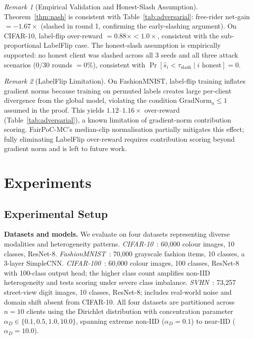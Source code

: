 \documentclass[journal]{IEEEtran}
\theoremstyle{definition}
\theoremstyle{remark}
\newtheorem{remark}{Remark}
\begin{document}
\begin{remark}[Empirical Validation and Honest-Slash Assumption]
\label{rem:empirical_val}
Theorem~\ref{thm:nash} is consistent with Table~\ref{tab:adversarial}:
free-rider net-gain $= -1.67{\times}$ (slashed in round 1, confirming
the early-slashing argument).
On CIFAR-10, label-flip over-reward $= 0.88{\times} < 1.0{\times}$,
consistent with the sub-proportional LabelFlip case.
The honest-slash assumption is empirically supported: no honest client
was slashed across all 3 seeds and all three attack scenarios
($0/30$ rounds $= 0\%$), consistent with
$\Pr[\hat{s}_i < \tau_{\mathrm{slash}} \mid i \text{ honest}] = 0$.
\end{remark}

\begin{remark}[LabelFlip Limitation]
\label{rem:labelflip_limit}
On FashionMNIST, label-flip training inflates gradient norms because
training on permuted labels creates large per-client divergence from the
global model, violating the condition $\mathrm{GradNorm}_a \leq 1$ assumed
in the proof.
This yields $1.12$--$1.16{\times}$ over-reward (Table~\ref{tab:adversarial}),
a known limitation of gradient-norm contribution scoring.
FairPoC-MC's median-clip normalisation partially mitigates this effect;
fully eliminating LabelFlip over-reward requires contribution scoring
beyond gradient norm and is left to future work.
\end{remark}

\section{Experiments}
\label{sec:experiments}

\subsection{Experimental Setup}
\label{subsec:setup}

\textbf{Datasets and models.}
We evaluate on four datasets representing diverse modalities and
heterogeneity patterns.
\emph{CIFAR-10}~\cite{krizhevsky2009learning}: 60{,}000 colour images,
10 classes, ResNet-8.
\emph{FashionMNIST}~\cite{xiao2017fashion}: 70{,}000 grayscale fashion
items, 10 classes, a 3-layer SimpleCNN.
\emph{CIFAR-100}~\cite{krizhevsky2009learning}: 60{,}000 colour images,
100 classes, ResNet-8 with 100-class output head; the higher class
count amplifies non-IID heterogeneity and tests scoring under
severe class imbalance.
\emph{SVHN}~\cite{netzer2011svhn}: 73{,}257 street-view digit images,
10 classes, ResNet-8; includes real-world noise and domain shift
absent from CIFAR-10.
All four datasets are partitioned across $n{=}10$ clients using
the Dirichlet distribution with concentration parameter
$\alpha_D \in \{0.1, 0.5, 1.0, 10.0\}$, spanning extreme non-IID
($\alpha_D{=}0.1$) to near-IID ($\alpha_D{=}10.0$).
\end{document}
